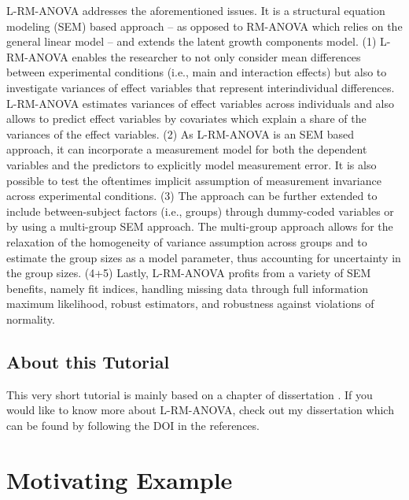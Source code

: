 \documentclass[
]{book}
\begin{document}
L-RM-ANOVA addresses the aforementioned issues. It is a structural equation modeling (SEM) based approach -- as opposed to RM-ANOVA which relies on the general linear model -- and extends the latent growth components model. (1) L-RM-ANOVA enables the researcher to not only consider mean differences between experimental conditions (i.e., main and interaction effects) but also to investigate variances of effect variables that represent interindividual differences. L-RM-ANOVA estimates variances of effect variables across individuals and also allows to predict effect variables by covariates which explain a share of the variances of the effect variables. (2) As L-RM-ANOVA is an SEM based approach, it can incorporate a measurement model for both the dependent variables and the predictors to explicitly model measurement error. It is also possible to test the oftentimes implicit assumption of measurement invariance across experimental conditions. (3) The approach can be further extended to include between-subject factors (i.e., groups) through dummy-coded variables or by using a multi-group SEM approach. The multi-group approach allows for the relaxation of the homogeneity of variance assumption across groups and to estimate the group sizes as a model parameter, thus accounting for uncertainty in the group sizes. (4+5) Lastly, L-RM-ANOVA profits from a variety of SEM benefits, namely fit indices, handling missing data through full information maximum likelihood, robust estimators, and robustness against violations of normality.

\hypertarget{about-this-tutorial}{%
\section*{About this Tutorial}\label{about-this-tutorial}}

This very short tutorial is mainly based on a chapter of dissertation \citep[see][Chapter 7 ``Software'']{Langenberg2022z}. If you would like to know more about L-RM-ANOVA, check out my dissertation which can be found by following the DOI in the references.

\hypertarget{motivating-example}{%
\chapter{Motivating Example}\label{motivating-example}}
\end{document}
